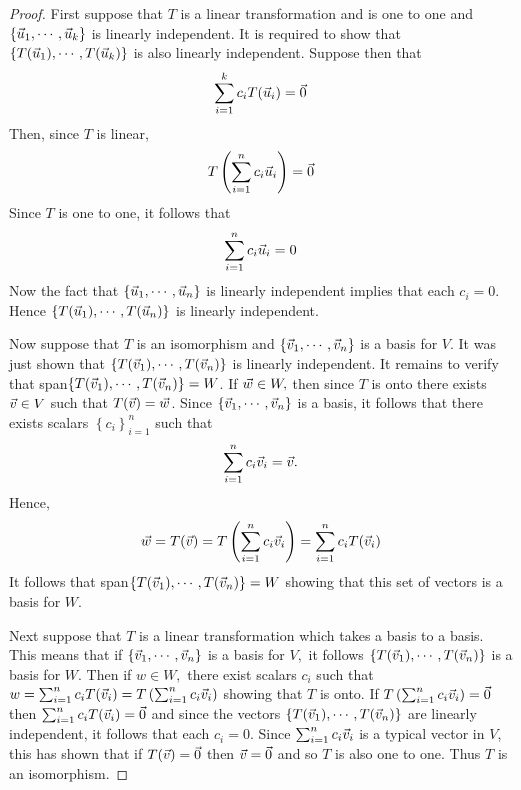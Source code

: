 \begin{proof}First suppose that $T$ is a linear transformation and is one to one
and $\left\{ \vec{u}_{1},\cdots ,\vec{u}_{k}\right\} $ is linearly
independent. It is required to show that $\left\{ T(\vec{u}_{1}),\cdots ,T(\vec{
u}_{k})\right\} $ is also linearly independent. Suppose then that 
\begin{equation*}
\sum_{i=1}^{k}c_{i}T(\vec{u}_{i})=\vec{0}
\end{equation*}
Then, since $T$ is linear, 
\begin{equation*}
T\left( \sum_{i=1}^{n}c_{i}\vec{u}_{i}\right) =\vec{0}
\end{equation*}
Since $T$ is one to one, it follows that 
\begin{equation*}
\sum_{i=1}^{n}c_{i}\vec{u}_{i}=0
\end{equation*}
Now the fact that $\left\{ \vec{u}_{1},\cdots ,\vec{u}_{n}\right\} $ is
linearly independent implies that each $c_{i}=0$. Hence $\left\{ T(\vec{u}
_{1}),\cdots ,T(\vec{u}_{n})\right\} $ is linearly independent.

Now suppose that $T$ is an isomorphism and $\left\{ \vec{v}_{1},\cdots ,\vec{
v}_{n}\right\} $ is a basis for $V$. It was just shown that $\left\{ T(\vec{v}
_{1}),\cdots ,T(\vec{v}_{n})\right\} $ is linearly independent. It remains to
verify that span$\left\{ T(\vec{v}_{1}),\cdots ,T(\vec{v}_{n})\right\}=W$. If $\vec{w}\in W,$ then since $T$ is onto there
exists $\vec{v}\in V$ such that $T(\vec{v})=\vec{w}$. Since $\left\{ \vec{v}
_{1},\cdots ,\vec{v}_{n}\right\} $ is a basis, it follows that there exists
scalars $\left\{ c_{i}\right\} _{i=1}^{n}$ such that 
\begin{equation*}
\sum_{i=1}^{n}c_{i}\vec{v}_{i}=\vec{v}.
\end{equation*}
Hence, 
\begin{equation*}
\vec{w}=T(\vec{v})=T\left( \sum_{i=1}^{n}c_{i}\vec{v}_{i}\right)
=\sum_{i=1}^{n}c_{i}T(\vec{v}_{i})
\end{equation*}
It follows that span$\left\{ T(\vec{v}_{1}),\cdots , T(\vec{v}_{n})\right\} =W$ showing that this set of vectors is a
basis for $W$.

Next suppose that $T$ is a linear transformation which takes a basis to a basis. This means that if $\left\{ \vec{v}_{1},\cdots ,\vec{v}_{n}\right\} $ is a basis for $V,$ it
follows $\left\{ T(\vec{v}_{1}),\cdots ,T(\vec{v}_{n})\right\} $ is a basis for $
W.$ Then if $w\in W,$ there exist scalars $c_{i}$ such that $
w=\sum_{i=1}^{n}c_{i}T(\vec{v}_{i})=T\left( \sum_{i=1}^{n}c_{i}\vec{v}_{i}\right) $
showing that $T$ is onto. If $T\left( \sum_{i=1}^{n}c_{i}\vec{v}_{i}\right) =\vec{0}$
then $\sum_{i=1}^{n}c_{i}T(\vec{v}_{i})=\vec{0}$ and since the vectors $\left\{ T(\vec{v}
_{1}),\cdots ,T(\vec{v}_{n})\right\} $ are linearly independent, it follows
that each $c_{i}=0.$ Since $\sum_{i=1}^{n}c_{i}\vec{v}_{i}$ is a typical vector in 
$V$, this has shown that if $T(\vec{v})=\vec{0}$ then $\vec{v}=\vec{0}$ and so $T$ is also one to one.
Thus $T$ is an isomorphism. 
\end{proof}

